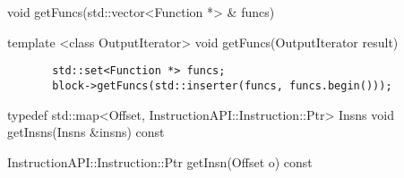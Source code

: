 \begin{apient}
void getFuncs(std::vector<Function *> & funcs)
\end{apient}

\begin{apient}
template <class OutputIterator>
void getFuncs(OutputIterator result)
\end{apient}

\begin{lstlisting}
       std::set<Function *> funcs;
       block->getFuncs(std::inserter(funcs, funcs.begin()));
\end{lstlisting}

\begin{apient}
typedef std::map<Offset, InstructionAPI::Instruction::Ptr> Insns
void getInsns(Insns &insns) const
\end{apient}

\begin{apient}
InstructionAPI::Instruction::Ptr getInsn(Offset o) const
\end{apient}

